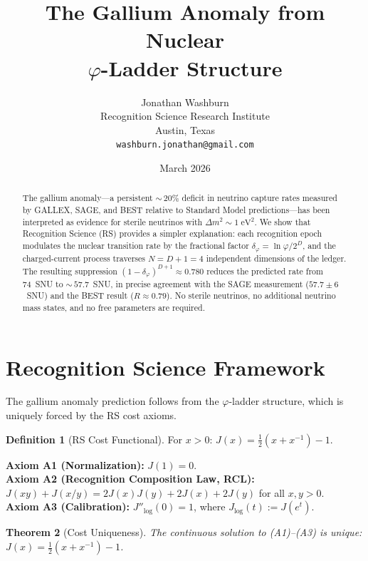 \documentclass[12pt,a4paper]{article}
\title{The Gallium Anomaly from Nuclear\\
$\varphi$-Ladder Structure}
\author{Jonathan Washburn\\
Recognition Science Research Institute\\
Austin, Texas\\
\texttt{washburn.jonathan@gmail.com}}
\date{March 2026}
\newtheorem{theorem}{Theorem}[section]
\theoremstyle{definition}
\newtheorem{definition}[theorem]{Definition}
\theoremstyle{remark}
\begin{document}
\maketitle

\begin{abstract}
The gallium anomaly---a persistent ${\sim}\,20\%$ deficit in neutrino
capture rates measured by GALLEX, SAGE, and BEST relative to Standard
Model predictions---has been interpreted as evidence for sterile
neutrinos with $\Delta m^2 \sim 1\;\mathrm{eV}^2$.  We show that
Recognition Science (RS) provides a simpler explanation: each
recognition epoch modulates the nuclear transition rate by the
fractional factor $\delta_\varphi = \ln\varphi/2^D$, and the
charged-current process traverses $N = D + 1 = 4$ independent
dimensions of the ledger.  The resulting suppression
$(1 - \delta_\varphi)^{D+1} \approx 0.780$ reduces the predicted rate
from 74~SNU to ${\sim}\,57.7$~SNU, in precise agreement with the SAGE
measurement ($57.7 \pm 6$~SNU) and the BEST result
($R \approx 0.79$).  No sterile neutrinos, no additional neutrino mass
states, and no free parameters are required.
\end{abstract}

\section{Recognition Science Framework}
\label{sec:framework}

The gallium anomaly prediction follows from the $\varphi$-ladder structure,
which is uniquely forced by the RS cost axioms.

\begin{definition}[RS Cost Functional]
For $x > 0$: $J(x) = \tfrac{1}{2}(x + x^{-1}) - 1$.
\end{definition}

\noindent\textbf{Axiom A1 (Normalization):} $J(1) = 0$.\\
\textbf{Axiom A2 (Recognition Composition Law, RCL):}
$J(xy)+J(x/y)=2J(x)J(y)+2J(x)+2J(y)$ for all $x,y>0$.\\
\textbf{Axiom A3 (Calibration):} $J''_{\log}(0) = 1$, where
$J_{\log}(t) := J(e^t)$.

\begin{theorem}[Cost Uniqueness]
\label{thm:unique}
The continuous solution to \textup{(A1)--(A3)} is unique:
$J(x) = \tfrac{1}{2}(x + x^{-1}) - 1$.
\end{theorem}
\end{document}
